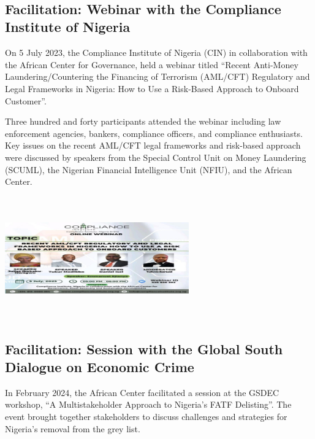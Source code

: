 \documentclass[
  letterpaper,
  DIV=11,
  numbers=noendperiod]{scrreprt}
\begin{document}
~~

\subsection{Facilitation: Webinar with the Compliance Institute of
Nigeria}\label{facilitation-webinar-with-the-compliance-institute-of-nigeria}

On 5 July 2023, the Compliance Institute of Nigeria (CIN) in
collaboration with the African Center for Governance, held a webinar
titled ``Recent Anti-Money Laundering/Countering the Financing of
Terrorism (AML/CFT) Regulatory and Legal Frameworks in Nigeria: How to
Use a Risk-Based Approach to Onboard Customer''.

Three hundred and forty participants attended the webinar including law
enforcement agencies, bankers, compliance officers, and compliance
enthusiasts. Key issues on the recent AML/CFT legal frameworks and
risk-based approach were discussed by speakers from the Special Control
Unit on Money Laundering (SCUML), the Nigerian Financial Intelligence
Unit (NFIU), and the African Center.

\begin{center}
\includegraphics[width=3.125in,height=2.08333in]{images/strengthen/02_counterfinance.png}
\end{center}

\subsection{Facilitation: Session with the Global South Dialogue on
Economic
Crime}\label{facilitation-session-with-the-global-south-dialogue-on-economic-crime}

In February 2024, the African Center facilitated a session at the GSDEC
workshop, ``A Multistakeholder Approach to Nigeria's FATF Delisting''.
The event brought together stakeholders to discuss challenges and
strategies for Nigeria's removal from the grey list.
\end{document}
